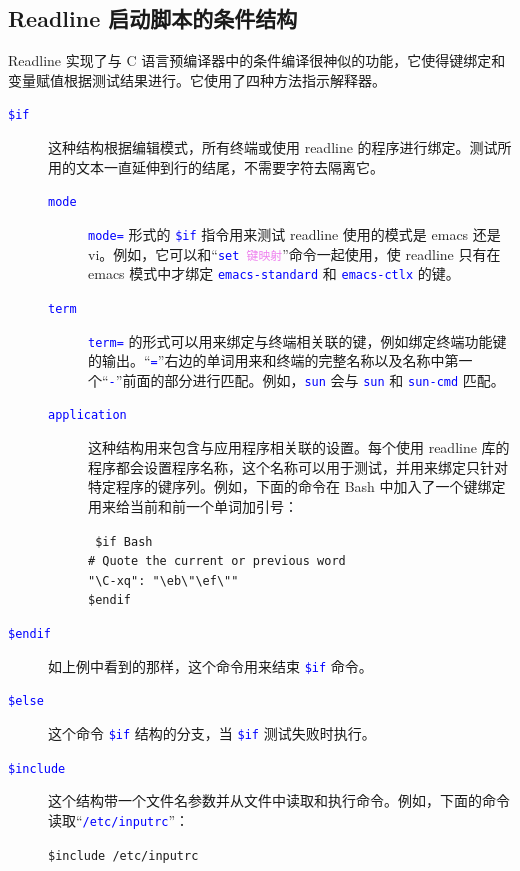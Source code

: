 \documentclass[openany,notitlepage]{book}
\newcommand{\codeblock}[1]{\begin{center}\begin{minipage}{.7\textwidth}{\tt #1}\end{minipage}\end{center}}
\newcommand{\codeConstant}[1]{\textcolor[RGB]{0,205,0}{\texttt{#1}}}
\newcommand{\codeComment}[1]{\textcolor[RGB]{255,96,96}{\texttt{#1}}}
\newcommand{\codeSpecial}[1]{\textcolor[RGB]{255,20,147}{\texttt{#1}}}
\newcommand{\codePreProc}[1]{\textcolor[RGB]{205,0,205}{\texttt{#1}}}
\newcommand{\codeStatement}[1]{\textcolor[RGB]{0,0,255}{\texttt{#1}}}
\newcommand{\code}[1]{\textcolor{blue}{{\tt #1}}}
\newcommand{\hs}[1]{{\textcolor{violet}{#1}}}
\begin{document}
\begin{CJK}{UTF8}{song}
\subsection{Readline 启动脚本的条件结构}\label{conditional-init} %
Readline 实现了与 C 语言预编译器中的条件编译很神似的功能，它使得键绑定和变量赋值根据测试结果进行。它使用了四种方法指示解释器。
\begin{description}
    \item[\code{\$if}] 这种结构根据编辑模式，所有终端或使用 readline 的程序进行绑定。测试所用的文本一直延伸到行的结尾，不需要字符去隔离它。
        \begin{description}
        \item[\code{mode}] \code{mode=} 形式的 \code{\$if} 指令用来测试 readline 使用的模式是 emacs 还是 vi。例如，它可以和``\code{set \hs{键映射}}''命令一起使用，使 readline 只有在 emacs 模式中才绑定 \code{emacs-standard} 和 \code{emacs-ctlx} 的键。
        \item[\code{term}] \code{term=} 的形式可以用来绑定与终端相关联的键，例如绑定终端功能键的输出。``\code{=}''右边的单词用来和终端的完整名称以及名称中第一个``\code{-}''前面的部分进行匹配。例如，\code{sun} 会与 \code{sun} 和 \code{sun-cmd} 匹配。
        \item[\code{application}] 这种结构用来包含与应用程序相关联的设置。每个使用 readline 库的程序都会设置程序名称，这个名称可以用于测试，并用来绑定只针对特定程序的键序列。例如，下面的命令在 Bash 中加入了一个键绑定用来给当前和前一个单词加引号：
            \codeblock{%
                \codeStatement{\$if} Bash\\
                \codeComment{\# Quote the current or previous word}\\
                \codeConstant{"}\codeSpecial{\textbackslash{}C-}\codeConstant{xq"}\codeStatement{:} "\textbackslash{}eb\textbackslash{}"\textbackslash{}ef\textbackslash{}""\\
                \codeStatement{\$endif}
            }
    \end{description}
    \item[\code{\$endif}] 如上例中看到的那样，这个命令用来结束 \code{\$if} 命令。
    \item[\code{\$else}] 这个命令 \code{\$if} 结构的分支，当 \code{\$if} 测试失败时执行。
    \item[\code{\$include}] 这个结构带一个文件名参数并从文件中读取和执行命令。例如，下面的命令读取``\code{/etc/inputrc}''：
    \codeblock{\codePreProc{\$include} /etc/inputrc}
\end{description}


\end{CJK}
\end{document}

